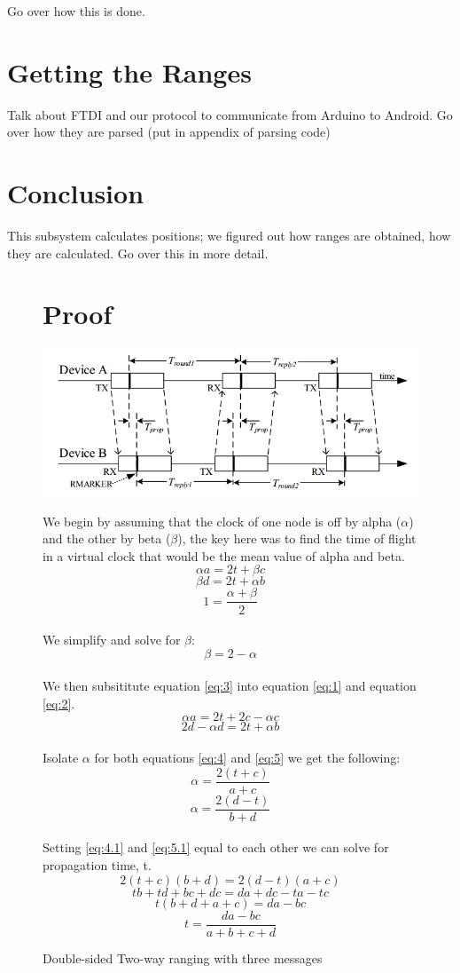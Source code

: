 Go over how this is done.

\section{Getting the Ranges}
Talk about FTDI and our protocol to communicate from Arduino to Android. Go over how they are parsed (put in appendix of parsing code)

\section{Conclusion}
This subsystem calculates positions; we figured out how ranges are obtained, how they are calculated. Go over this in more detail.

\begin{figure}
\section{Proof}
	\includegraphics[width=\linewidth]{tprop.png}
	\caption{Double-sided Two-way ranging with three messages}

We begin by assuming that the clock of one node is off by alpha ($\alpha$) and the other by beta ($\beta$), the key here was to find the time of flight in a virtual clock that would be the mean value of alpha and beta.
\\
\[ \alpha a = 2t + \beta c  \tag{1} \label{eq:1} \]
\[ \beta d = 2t + \alpha b  \tag{2} \label{eq:2} \]
\[ 1 = \frac{\alpha + \beta}{2} \]
\\
We simplify and solve for $\beta$:
\\
\[ \beta = 2 - \alpha  \tag{3} \label{eq:3} \]
\\
We then subsititute equation \eqref{eq:3} into equation \eqref{eq:1} and equation \eqref{eq:2}.
\\
\[ \alpha a = 2t + 2c - \alpha c  \tag{4} \label{eq:4} \]
\[ 2d - \alpha d = 2t + \alpha b  \tag{5} \label{eq:5} \]
\\
Isolate $\alpha$ for both equations \eqref{eq:4} and \eqref{eq:5} we get the following:
\\
\[ \alpha = \frac{2(t + c)}{a + c}  \tag{4.1} \label{eq:4.1} \]
\[ \alpha = \frac{2(d - t)}{b + d}  \tag{5.1} \label{eq:5.1} \]
\\
Setting \eqref{eq:4.1} and \eqref{eq:5.1} equal to each other we can solve for propagation time, t.
\\
\[ 2(t + c)(b +d) = 2(d - t)(a + c)\]
\[ tb + td +bc + dc = da + dc - ta - tc \]
\[ t(b + d + a + c) = da - bc\]
\[ t = \frac{da-bc}{a + b + c + d}  \tag{6} \label{eq:6} \]
\end{figure}
